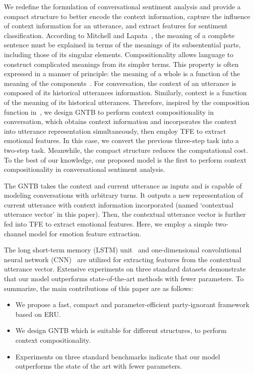 \documentclass[journal]{IEEEtran}
\begin{document}
We redefine the formulation of conversational sentiment analysis and provide a compact structure to better encode the context information, capture the influence of context information for an utterance, and extract features for sentiment classification. According to Mitchell and Lapata~\cite{mitchell2010composition}, the meaning of a complete sentence must be explained in terms of the meanings of its subsentential parts, including those of its singular elements. Compositionality allows language to construct complicated meanings from its simpler terms. This property is often expressed in a manner of principle: the meaning of a whole is a function of the meaning of the components~\cite{partee1995lexical}. For conversation, the context of an utterance is composed of its historical utterances information. Similarly, context is a function of the meaning of its historical utterances. Therefore, inspired by the composition function in~\cite{partee1995lexical}, we design GNTB to perform context compositionality in conversation, which obtains context information and incorporates the context into utterance representation simultaneously, then employ TFE to extract emotional features. In this case, we convert the previous three-step task into a two-step task. Meanwhile, the compact structure reduces the computational cost. To the best of our knowledge, our proposed model is the first to perform context compositionality in conversational sentiment analysis.

The GNTB takes the context and current utterance as inputs and is capable of modeling conversations with arbitrary turns. It outputs a new representation of current utterance with context information incorporated (named `contextual utterance vector' in this paper). Then, the contextual utterance vector is further fed into TFE to extract emotional features. Here, we employ a simple two-channel model for emotion feature extraction.

The long short-term memory (LSTM) unit~\cite{hochreiter1997long} and one-dimensional convolutional neural network (CNN)~\cite{kim2014convolutional} are utilized for extracting features from the contextual utterance vector. Extensive experiments on three standard datasets demonstrate that our model outperforms state-of-the-art methods with fewer parameters. To summarize, the main contributions of this paper are as follows:

\begin{itemize}
    \item We propose a fast, compact and parameter-efficient party-ignorant framework based on ERU.
    \item We design GNTB which is suitable for different structures, to perform context compositionality.
    \item Experiments on three standard benchmarks indicate that our model outperforms the state of the art with fewer parameters.
\end{itemize}
\end{document}
